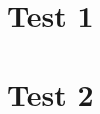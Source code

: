 \documentclass{beamer}
\begin{document}
\section{Test 1}
\begin{frame}
\end{frame}

\section{Test 2}
\begin{frame}
\end{frame}
\end{document}
